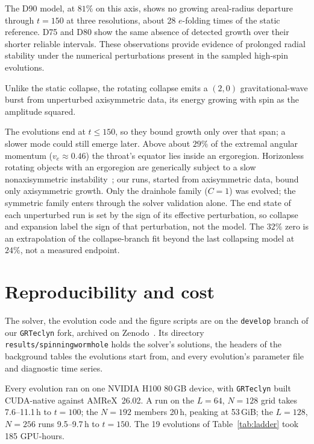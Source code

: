 \documentclass[twocolumn,floatfix,aps,prd,superscriptaddress,nofootinbib]{revtex4-2}
\begin{document}
The D90 model, at $81\%$ on this axis, shows no growing areal-radius departure through $t=150$ at three resolutions, about 28 $e$-folding times of the static reference. D75 and D80 show the same absence of detected growth over their shorter reliable intervals. These observations provide evidence of prolonged radial stability under the numerical perturbations present in the sampled high-spin evolutions.

Unlike the static collapse, the rotating collapse emits a $(2,0)$ gravitational-wave burst from unperturbed axisymmetric data, its energy growing with spin as the amplitude squared.

The evolutions end at $t\le150$, so they bound growth only over that span; a slower mode could still emerge later. Above about $29\%$ of the extremal angular momentum ($v_e\approx0.46$) the throat's equator lies inside an ergoregion. Horizonless rotating objects with an ergoregion are generically subject to a slow nonaxisymmetric instability~\cite{friedman1978,cardoso2008}; our runs, started from axisymmetric data, bound only axisymmetric growth. Only the drainhole family ($C=1$) was evolved; the symmetric family enters through the solver validation alone. The end state of each unperturbed run is set by the sign of its effective perturbation, so collapse and expansion label the sign of that perturbation, not the model. The $32\%$ zero is an extrapolation of the collapse-branch fit beyond the last collapsing model at $24\%$, not a measured endpoint.

\section{Reproducibility and cost}
\label{sec:data}

The solver, the evolution code and the figure scripts are on the \texttt{develop} branch of our \texttt{GRTeclyn} fork, archived on Zenodo~\cite{shirokov2026code}. Its directory \texttt{results/spinningwormhole} holds the solver's solutions, the headers of the background tables the evolutions start from, and every evolution's parameter file and diagnostic time series.

Every evolution ran on one NVIDIA H100 80\,GB device, with \texttt{GRTeclyn} built CUDA-native against AMReX~26.02. A run on the $L=64$, $N=128$ grid takes 7.6--11.1\,h to $t=100$; the $N=192$ members 20\,h, peaking at 53\,GiB; the $L=128$, $N=256$ runs 9.5--9.7\,h to $t=150$. The 19 evolutions of Table~\ref{tab:ladder} took 185 GPU-hours.
\end{document}

